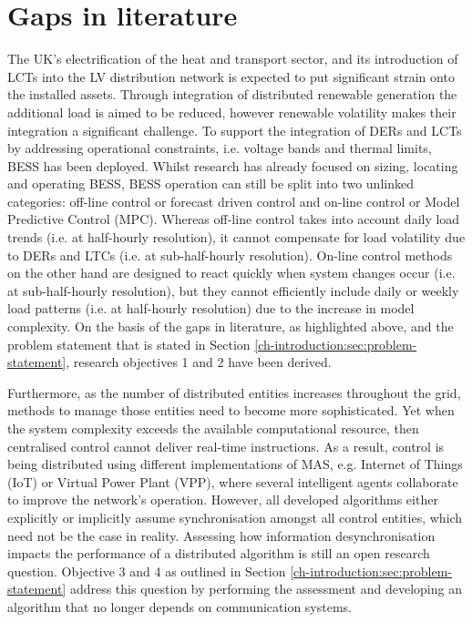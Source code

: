 \section{Gaps in literature}
\label{ch-literature:sec:literature-gaps}

The UK's electrification of the heat and transport sector, and its introduction of LCTs into the LV distribution network is expected to put significant strain onto the installed assets.
Through integration of distributed renewable generation the additional load is aimed to be reduced, however renewable volatility makes their integration a significant challenge.
To support the integration of DERs and LCTs by addressing operational constraints, i.e. voltage bands and thermal limits, BESS has been deployed.
Whilst research has already focused on sizing, locating and operating BESS, BESS operation can still be split into two unlinked categories: off-line control or forecast driven control and on-line control or Model Predictive Control (MPC).
Whereas off-line control takes into account daily load trends (i.e. at half-hourly resolution), it cannot compensate for load volatility due to DERs and LTCs (i.e. at sub-half-hourly resolution).
On-line control methods on the other hand are designed to react quickly when system changes occur (i.e. at sub-half-hourly resolution), but they cannot efficiently include daily or weekly load patterns (i.e. at half-hourly resolution) due to the increase in model complexity.
On the basis of the gaps in literature, as highlighted above, and the problem statement that is stated in Section \ref{ch-introduction:sec:problem-statement}, research objectives 1 and 2 have been derived.

Furthermore, as the number of distributed entities increases throughout the grid, methods to manage those entities need to become more sophisticated.
Yet when the system complexity exceeds the available computational resource, then centralised control cannot deliver real-time instructions.
As a result, control is being distributed using different implementations of MAS, e.g. Internet of Things (IoT) or Virtual Power Plant (VPP), where several intelligent agents collaborate to improve the network's operation.
However, all developed algorithms either explicitly or implicitly assume synchronisation amongst all control entities, which need not be the case in reality.
Assessing how information desynchronisation impacts the performance of a distributed algorithm is still an open research question.
Objective 3 and 4 as outlined in Section \ref{ch-introduction:sec:problem-statement} address this question by performing the assessment and developing an algorithm that no longer depends on communication systems.

